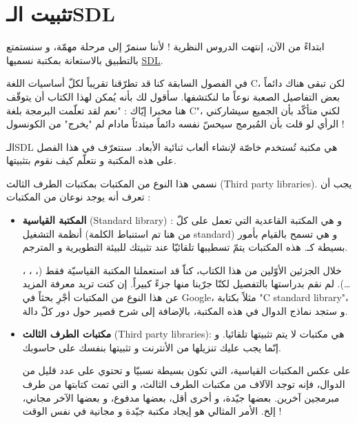 \chapter{تثبيت الـ\textenglish{SDL}}

ابتداءً من الآن، إنتهت الدروس النظرية ! لأننا سنمرّ إلى مرحلة مهمّة، و سنستمتع بالتطبيق بالاستعانة بمكتبة نسميها
\underline{\textenglish{SDL}}.

في الفصول السابقة كنا قد تطرّقنا تقريباً لكلّ أساسيات اللغة
\textenglish{C}،
لكن تبقى هناك دائماً بعض التفاصيل الصعبة نوعاً ما لنكتشفها. سأقول لك بأنه يُمكن لهذا الكتاب أن يتوقّف هنا مخبرا إيّاك : "نعم لقد تعلّمت البرمجة بلغة 
\textenglish{C}"،
لكني متأكّد بأن الجميع سيشاركني الرأي لو قلت بأن المُبرمج سيحسّ نفسه دائماً مبتدئاً مادام لم "يخرج" من الكونسول !

الـ\textenglish{SDL}
هي مكتبة تُستخدم خاصّة لإنشاء ألعاب ثنائية الأبعاد. سنتعرّف في هذا الفصل على هذه المكتبة و نتعلّم كيف نقوم بتثبيتها.

نسمي هذا النوع من المكتبات بمكتبات الطرف الثالث 
(\textenglish{Third party libraries}).
يجب أن تعرف أنه يوجد نوعان من المكتبات :

\begin{itemize}
	\item \textbf{المكتبة القياسية}
	(\textenglish{Standard library}) :
	و هي المكتبة القاعدية التي تعمل على كلّ أنظمة التشغيل (من هنا تم استنباط الكلمة 
	\textenglish{standard})
	و هي تسمح بالقيام بأمور بسيطة كـ.
	هذه المكتبات يتمّ تسطيبها تلقائيّا عند تثبيتك للبيئة التطويرية و المترجم.
	
	خلال الجزئين الأوّلين من هذا الكتاب، كناّ قد استعملنا المكتبة القياسيّة فقط
(، ، ،  \dots).
	لم نقم بدراستها بالتفصيل لكنّا جرّبنا منها جزءً كبيراً. إن كنت تريد معرفة المزيد عن هذا النوع من المكتبات أجْرِ بحثاً في 
	\textenglish{Google}،
	مثلاً بكتابة
	"\textenglish{C standard library}"،
	و ستجد نماذج الدوال في هذه المكتبة، بالإضافة إلى شرح قصير حول دور كلّ دالة.
	\item \textbf{مكتبات الطرف الثالث}
	(\textenglish{Third party libraries}):
	هي مكتبات لا يتم تثبيتها تلقائيا. و إنّما يجب عليك تنزيلها من الأنترنت و تثبيتها بنفسك على حاسوبك.

	على عكس المكتبات القياسية، التي تكون بسيطة نسبيّا و تحتوي على عدد قليل من الدوال، فإنه توجد الآلاف من مكتبات الطرف الثالث، و التي تمت كتابتها من طرف مبرمجين آخرين. بعضها جيّدة، و أخرى أقل، بعضها مدفوع، و بعضها الآخر مجاني، إلخ. الأمر المثالي هو إيجاد مكتبة جيّدة و مجانية في نفس الوقت !
\end{itemize}

